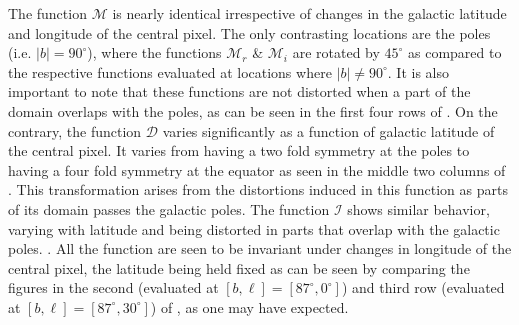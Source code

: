 %
The function $\mathcal{M}$ is nearly identical irrespective of changes in the galactic latitude and longitude of the central pixel. The only contrasting locations are the poles (i.e. $|b|=90^{\circ}$), where the functions $\mathcal{M}_r$ \& $\mathcal{M}_i$ are rotated by $45^{\circ}$  as compared to the respective functions evaluated at locations where $|b|\neq 90^{\circ}$. It is also important to note that these functions are not distorted when a part of the domain overlaps with the poles, as can be seen in the first four rows of . On the contrary, the function $\mathcal{D}$ varies significantly as a function of galactic latitude of the central pixel. It varies from having a two fold symmetry at the poles to having a four fold symmetry at the equator as seen in the middle two columns of . This transformation arises from the distortions induced in this function as parts of its domain passes the galactic poles.  The function $\mathcal{I}$ shows similar behavior, varying with latitude and being distorted in parts that overlap with the galactic poles. . All the function are seen to be invariant under changes in longitude of the central pixel, the latitude being held fixed as can be seen by comparing the figures in the second (evaluated at $[b,\ell]=[87^{\circ},0^{\circ}]$) and third row (evaluated at $[b,\ell]=[87^{\circ},30^{\circ}]$) of , as one may have expected.

